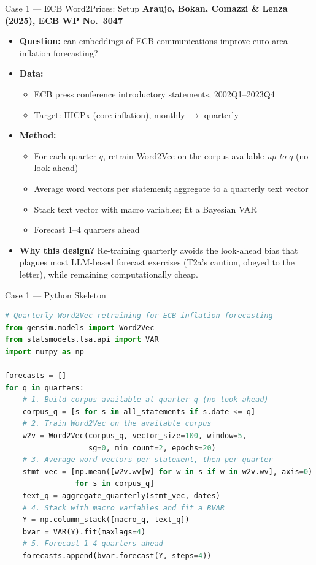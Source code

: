 \begin{frame}{Case 1 --- ECB Word2Prices: Setup}
\textbf{Araujo, Bokan, Comazzi \& Lenza (2025), ECB WP No.\ 3047}

\medskip
\begin{itemize}
\item \textbf{Question:} can embeddings of ECB communications improve euro-area inflation forecasting?

\medskip
\item \textbf{Data:}
\begin{itemize}
    \item ECB press conference introductory statements, 2002Q1--2023Q4
    \item Target: HICPx (core inflation), monthly $\rightarrow$ quarterly
\end{itemize}

\medskip
\item \textbf{Method:}
\begin{itemize}
    \item For each quarter $q$, retrain Word2Vec on the corpus available \emph{up to} $q$ (no look-ahead)
    \item Average word vectors per statement; aggregate to a quarterly text vector
    \item Stack text vector with macro variables; fit a Bayesian VAR
    \item Forecast 1--4 quarters ahead
\end{itemize}

\medskip
\item \textbf{Why this design?} Re-training quarterly avoids the look-ahead bias that plagues most LLM-based forecast exercises (T2a's caution, obeyed to the letter), while remaining computationally cheap.
\end{itemize}
\end{frame}

\begin{frame}[fragile]{Case 1 --- Python Skeleton}
\begin{lstlisting}[language=Python, basicstyle=\scriptsize\ttfamily]
# Quarterly Word2Vec retraining for ECB inflation forecasting
from gensim.models import Word2Vec
from statsmodels.tsa.api import VAR
import numpy as np

forecasts = []
for q in quarters:
    # 1. Build corpus available at quarter q (no look-ahead)
    corpus_q = [s for s in all_statements if s.date <= q]
    # 2. Train Word2Vec on the available corpus
    w2v = Word2Vec(corpus_q, vector_size=100, window=5,
                   sg=0, min_count=2, epochs=20)
    # 3. Average word vectors per statement, then per quarter
    stmt_vec = [np.mean([w2v.wv[w] for w in s if w in w2v.wv], axis=0)
                for s in corpus_q]
    text_q = aggregate_quarterly(stmt_vec, dates)
    # 4. Stack with macro variables and fit a BVAR
    Y = np.column_stack([macro_q, text_q])
    bvar = VAR(Y).fit(maxlags=4)
    # 5. Forecast 1-4 quarters ahead
    forecasts.append(bvar.forecast(Y, steps=4))
\end{lstlisting}
\end{frame}

